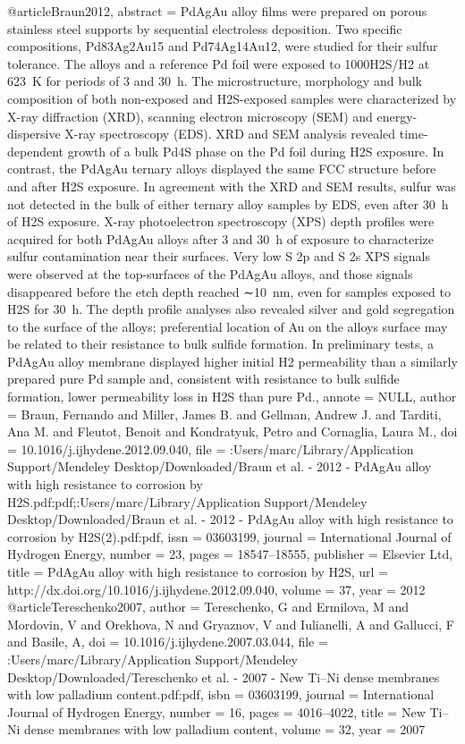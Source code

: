 @article{Braun2012,
abstract = {PdAgAu alloy films were prepared on porous stainless steel supports by sequential electroless deposition. Two specific compositions, Pd83Ag2Au15 and Pd74Ag14Au12, were studied for their sulfur tolerance. The alloys and a reference Pd foil were exposed to 1000H2S/H2 at 623 K for periods of 3 and 30 h. The microstructure, morphology and bulk composition of both non-exposed and H2S-exposed samples were characterized by X-ray diffraction (XRD), scanning electron microscopy (SEM) and energy-dispersive X-ray spectroscopy (EDS). XRD and SEM analysis revealed time-dependent growth of a bulk Pd4S phase on the Pd foil during H2S exposure. In contrast, the PdAgAu ternary alloys displayed the same FCC structure before and after H2S exposure. In agreement with the XRD and SEM results, sulfur was not detected in the bulk of either ternary alloy samples by EDS, even after 30 h of H2S exposure. X-ray photoelectron spectroscopy (XPS) depth profiles were acquired for both PdAgAu alloys after 3 and 30 h of exposure to characterize sulfur contamination near their surfaces. Very low S 2p and S 2s XPS signals were observed at the top-surfaces of the PdAgAu alloys, and those signals disappeared before the etch depth reached ∼10 nm, even for samples exposed to H2S for 30 h. The depth profile analyses also revealed silver and gold segregation to the surface of the alloys; preferential location of Au on the alloys surface may be related to their resistance to bulk sulfide formation. In preliminary tests, a PdAgAu alloy membrane displayed higher initial H2 permeability than a similarly prepared pure Pd sample and, consistent with resistance to bulk sulfide formation, lower permeability loss in H2S than pure Pd.},
annote = {NULL},
author = {Braun, Fernando and Miller, James B. and Gellman, Andrew J. and Tarditi, Ana M. and Fleutot, Benoit and Kondratyuk, Petro and Cornaglia, Laura M.},
doi = {10.1016/j.ijhydene.2012.09.040},
file = {:Users/marc/Library/Application Support/Mendeley Desktop/Downloaded/Braun et al. - 2012 - PdAgAu alloy with high resistance to corrosion by H2S.pdf:pdf;:Users/marc/Library/Application Support/Mendeley Desktop/Downloaded/Braun et al. - 2012 - PdAgAu alloy with high resistance to corrosion by H2S(2).pdf:pdf},
issn = {03603199},
journal = {International Journal of Hydrogen Energy},
number = {23},
pages = {18547--18555},
publisher = {Elsevier Ltd},
title = {{PdAgAu alloy with high resistance to corrosion by H2S}},
url = {http://dx.doi.org/10.1016/j.ijhydene.2012.09.040},
volume = {37},
year = {2012}
}
@article{Tereschenko2007,
author = {Tereschenko, G and Ermilova, M and Mordovin, V and Orekhova, N and Gryaznov, V and Iulianelli, A and Gallucci, F and Basile, A},
doi = {10.1016/j.ijhydene.2007.03.044},
file = {:Users/marc/Library/Application Support/Mendeley Desktop/Downloaded/Tereschenko et al. - 2007 - New Ti–Ni dense membranes with low palladium content.pdf:pdf},
isbn = {03603199},
journal = {International Journal of Hydrogen Energy},
number = {16},
pages = {4016--4022},
title = {{New Ti–Ni dense membranes with low palladium content}},
volume = {32},
year = {2007}
}
